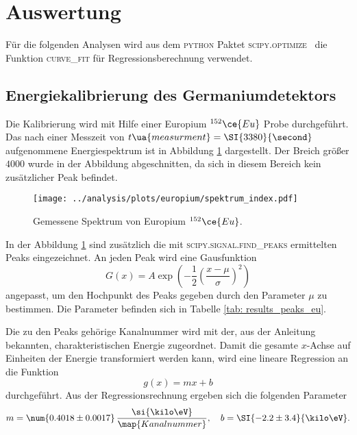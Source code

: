 \section{Auswertung}
Für die folgenden Analysen wird aus dem \textsc{python} Paktet \textsc{scipy.optimize}~\cite{scipy}
die Funktion \textsc{curve\_{fit}} für Regressionsberechnung verwendet.

\subsection{Energiekalibrierung des Germaniumdetektors}\label{sec:kalibrierung}
\FloatBarrier
Die Kalibrierung wird mit Hilfe einer Europium $^{152}\ce{Eu}$ Probe
durchgeführt. Das nach einer Messzeit von $t\ua{measurment}=\SI{3380}{\second}$
aufgenommene Energiespektrum ist in Abbildung \ref{fig:spectrum_europ} dargestellt.
Der Breich größer $4000$ wurde in der Abbildung abgeschnitten, da sich in diesem
Bereich kein zusätzlicher Peak befindet.
\begin{figure}
  \centering
  \texttt{[image: ../analysis/plots/europium/spektrum\_index.pdf]}
  \caption{Gemessene Spektrum von Europium $^{152}\ce{Eu}$.}
  \label{fig:spectrum_europ}
\end{figure}
In der Abbildung \ref{fig:spectrum_europ} sind zusätzlich die mit
\textsc{scipy.signal.find\_{peaks}} ermittelten Peaks eingezeichnet.
An jeden Peak wird eine Gausfunktion
\begin{equation}
  \label{eq:gaus}
  G(x)=A\exp{\left(-\frac{1}{2}\left(\frac{x-\mu}{\sigma}\right)^2\right)}
\end{equation}
angepasst, um den Hochpunkt des Peaks gegeben durch den Parameter $\mu$ zu
bestimmen. Die Parameter befinden sich in Tabelle \ref{tab: results_peaks_eu}.

Die zu den Peaks gehörige Kanalnummer wird mit der, aus der Anleitung \cite{anleitungv18}
bekannten, charakteristischen Energie zugeordnet.
Damit die gesamte $x$-Achse auf Einheiten der Energie transformiert werden kann,
wird eine lineare Regression an die Funktion
\begin{equation*}
  g(x)=mx+b
\end{equation*}
durchgeführt.
Aus der Regressionsrechnung ergeben sich die folgenden Parameter
\begin{equation}
  \label{eq:Kanal_energie_trafo}
  m=\num{0.4018\pm0.0017}\,\frac{\si{\kilo\eV}}{\map{Kanalnummer}}, \quad b=\SI{-2.2\pm3.4}{\kilo\eV}.
\end{equation}
